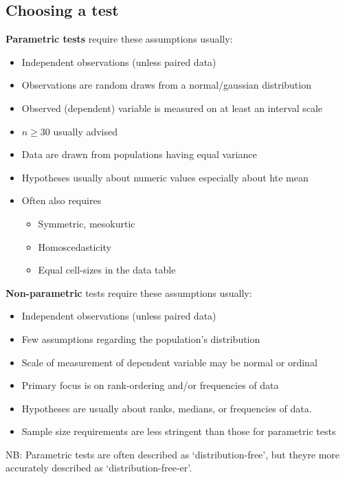 \documentclass[11pt,a4paper,titlepage,dvipsnames,cmyk]{scrartcl}
\begin{document}
\subsection{Choosing a test}
\textbf{Parametric tests} require these assumptions usually:
\begin{itemize}
    \item Independent observations (unless paired data)
    \item Observations are random draws from a normal/gaussian distribution
    \item Observed (dependent) variable is measured on at least an interval scale
    \item $n \ge 30$ usually advised
    \item Data are drawn from populations having equal variance
    \item Hypotheses usually about numeric values especially about hte mean
    \item Often also requires
    \begin{itemize}
        \item Symmetric, mesokurtic
        \item Homoscedasticity
        \item Equal cell-sizes in the data table
    \end{itemize}
\end{itemize}

\textbf{Non-parametric} tests require these assumptions usually:
\begin{itemize}
    \item Independent observations (unless paired data)
    \item Few assumptions regarding the population's distribution
    \item Scale of measurement of dependent variable may be normal or ordinal
    \item Primary focus is on rank-ordering and/or frequencies of data
    \item Hypotheses are usually about ranks, medians, or frequencies of data.
    \item Sample size requirements are less stringent than those for parametric tests
\end{itemize}

NB: Parametric tests are often described as `distribution-free', but theyre more accurately described as `distribution-free-er'.
\end{document}
